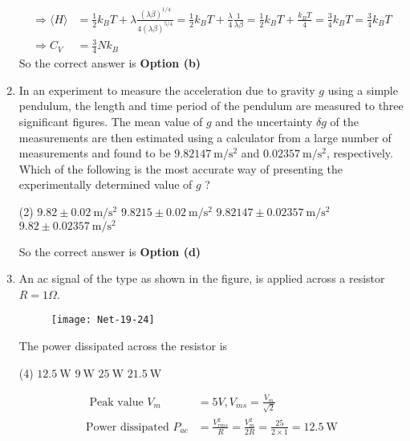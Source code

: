 \begin{enumerate}
\begin{answer}
\begin{align*}
	\Rightarrow\langle H\rangle&=\frac{1}{2} k_{B} T+\lambda \frac{(\lambda \beta)^{1 / 4}}{4(\lambda \beta)^{5 / 4}}=\frac{1}{2} k_{B} T+\frac{\lambda}{4} \frac{1}{\lambda \beta}=\frac{1}{2} k_{B} T+\frac{k_{B} T}{4}=\frac{3}{4} k_{B} T=\frac{3}{4} k_{B} T \\
	\Rightarrow C_{V}&=\frac{3}{4} N k_{B}
	\end{align*}
		So the correct answer is \textbf{Option (b)}
\end{answer}
\item  In an experiment to measure the acceleration due to gravity $g$ using a simple pendulum, the length and time period of the pendulum are measured to three significant figures. The mean value of $g$ and the uncertainty $\delta g$ of the measurements are then estimated using a calculator from a large number of measurements and found to be $9.82147 \mathrm{~m} / \mathrm{s}^{2}$ and $0.02357 \mathrm{~m} / \mathrm{s}^{2}$, respectively. Which of the following is the most accurate way of presenting the experimentally determined value of $g$ ?
 \begin{tasks}(2)
	\task[\textbf{a.}]$9.82 \pm 0.02 \mathrm{~m} / \mathrm{s}^{2}$
	\task[\textbf{b.}]$9.8215 \pm 0.02 \mathrm{~m} / \mathrm{s}^{2}$
	\task[\textbf{c.}]$9.82147 \pm 0.02357 \mathrm{~m} / \mathrm{s}^{2}$
	\task[\textbf{d.}] $9.82 \pm 0.02357 \mathrm{~m} / \mathrm{s}^{2}$ 
\end{tasks}
\begin{answer}
	So the correct answer is \textbf{Option (d)}
\end{answer}
\item  An ac signal of the type as shown in the figure, is applied across a resistor $R=1 \Omega$.
\begin{figure}[H]
	\centering
	\texttt{[image: Net-19-24]}
\end{figure}
The power dissipated across the resistor is
 \begin{tasks}(4)
	\task[\textbf{a.}]$12.5 \mathrm{~W}$
	\task[\textbf{b.}]$9 \mathrm{~W}$
	\task[\textbf{c.}]$25 \mathrm{~W}$
	\task[\textbf{d.}]$21.5 \mathrm{~W}$ 
\end{tasks}
\begin{answer}
	\begin{align*}
	\text { Peak value } V_{m}&=5 V, V_{m s}=\frac{V_{m}}{\sqrt{2}}\\
	\text{Power dissipated }P_{a c}&=\frac{V_{r m s}^{2}}{R}=\frac{V_{m}^{2}}{2 R}=\frac{25}{2 \times 1}=12.5 \mathrm{~W}\\

\end{align*}
\end{answer}
\end{enumerate}
